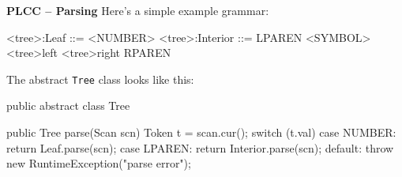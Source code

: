 \begin{minipage}[t]{\sw}
\slidenumber
\LARGE
{\bf PLCC -- Parsing}\exx
Here's a simple example grammar:
{\Large
\begin{qv}
<tree>:Leaf     ::= <NUMBER>
<tree>:Interior ::= LPAREN <SYMBOL> <tree>left <tree>right RPAREN
\end{qv}
}
The abstract \verb'Tree' class looks like this:
{\Large
\begin{qv}
public abstract class Tree {

    public Tree parse(Scan scn) {
        Token t = scan.cur();
        switch (t.val) {
        case NUMBER:
            return Leaf.parse(scn);
        case LPAREN:
            return Interior.parse(scn);
        default:
            throw new RuntimeException("parse error");
        }
    }
}
\end{qv}
}
\end{minipage}
\clearpage
